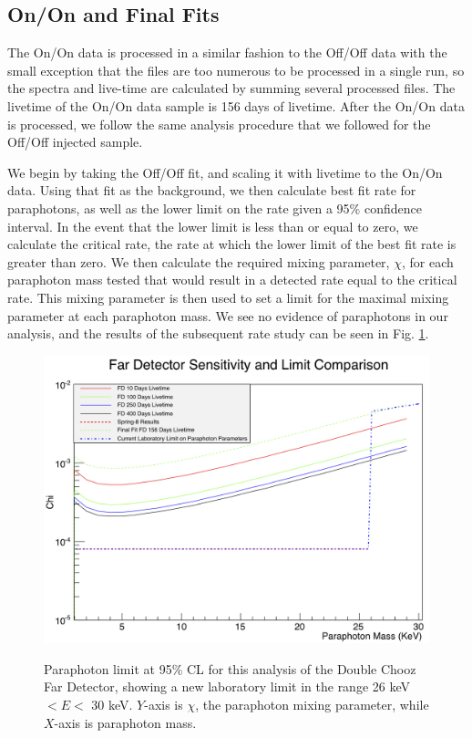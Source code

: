 \subsection{On/On and Final Fits}
The On/On data is processed in a similar fashion to the Off/Off data with the small exception that the files are too numerous to be processed in a single run, so the spectra and live-time are calculated by summing several processed files. The livetime of the On/On data sample is 156 days of livetime. After the On/On data is processed, we follow the same analysis procedure that we followed for the Off/Off injected sample. 

We begin by taking the Off/Off fit, and scaling it with livetime to the On/On data. Using that fit as the background, we then calculate best fit rate for paraphotons, as well as the lower limit on the rate given a 95\% confidence interval. In the event that the lower limit is less than or equal to zero, we calculate the critical rate, the rate at which the lower limit of the best fit rate is greater than zero. We then calculate the required mixing parameter, $\chi$, for each paraphoton mass tested  that would result in a detected rate equal to the critical rate. This mixing parameter is then used to set a limit for the maximal mixing parameter at each paraphoton mass. We see no evidence of paraphotons in our analysis, and the results of the subsequent rate study can be seen in Fig. \ref{FinalFit}.

\begin{figure}
\caption{Paraphoton limit at 95\% CL for this analysis of the Double Chooz Far Detector, showing a new laboratory limit in the range 26 keV $<E <$ 30 keV. $Y$-axis is $\chi$, the paraphoton mixing parameter, while $X$-axis is paraphoton mass.}
\includegraphics[width=\textwidth]{Paraphotons/Final_Fit_W_Sensitivity_156.jpg}
\label{FinalFit}
\end{figure}

